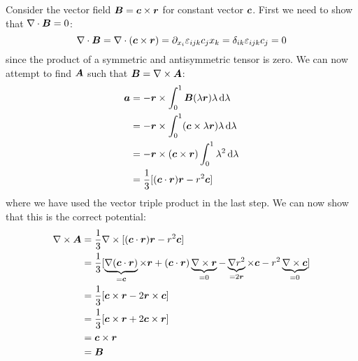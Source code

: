 \documentclass{article}
\newcommand{\pdvx}[1]{\partial_{x_{#1}}}
\begin{document}
    \example
    Consider the vector field \(\bm{B} = \bm{c}\times\bm{r}\) for constant vector \(\bm{c}\).
    First we need to show that \(\nabla\cdot\bm{B} = 0\):
    \[\div\vv B = \div(\vv c\times\vv r) = \pdvx i\varepsilon_{ijk} c_j x_k = \delta_{ik}\varepsilon_{ijk}c_j = 0\]
    since the product of a symmetric and antisymmetric tensor is zero.
    We can now attempt to find \(\bm{A}\) such that \(\bm{B} = \nabla\times\bm{A}\):
    \begin{align*}
        \bm{a} &= -\bm{r}\times\int_0^1\bm{B}(\lambda\bm{r})\lambda\,\dd\lambda\\
        &= -\bm{r}\times\int_0^1 (\bm{c}\times \lambda\bm{r})\lambda\,\dd\lambda\\
        &= -\bm{r}\times(\bm{c}\times\bm{r})\int_0^1\lambda^2\,\dd\lambda\\
        &= \frac{1}{3}[(\bm{c}\cdot\bm{r})\bm{r} - r^2\bm{c}]
    \end{align*}
    where we have used the vector triple product in the last step.
    We can now show that this is the correct potential:
    \begin{align*}
        \nabla\times\bm{A} &= \frac{1}{3}\nabla\times[(\bm{c}\cdot\bm{r})\bm{r} - r^2\bm{c}]\\
        &= \frac{1}{3}[\underbrace{\nabla(\bm{c}\cdot\bm{r})}_{=\bm{c}}\times\bm{r} + (\bm{c}\cdot\bm{r})\underbrace{\nabla\times\bm{r}}_{=0} - \underbrace{\nabla r^2}_{=2\bm{r}}\times\bm{c} - r^2\underbrace{\nabla\times\bm{c}}_{=0}]\\
        &= \frac{1}{3}[\bm{c}\times\bm{r} - 2\bm{r}\times\bm{c}]\\
        &= \frac{1}{3}[\bm{c}\times\bm{r} + 2\bm{c}\times\bm{r}]\\
        &= \bm{c}\times\bm{r}\\
        &= \bm{B}
    \end{align*}
    
\end{document}

